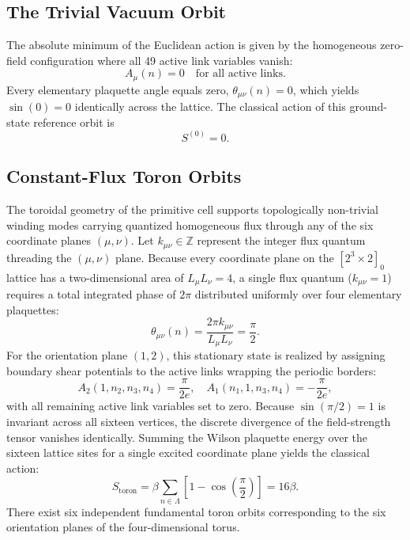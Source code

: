 \documentclass[11pt,a4paper]{article}
\begin{document}
\subsection{The Trivial Vacuum Orbit}
The absolute minimum of the Euclidean action is given by the homogeneous zero-field configuration where all 49 active link variables vanish:
\begin{equation}
A_\mu(n) = 0 \quad \text{for all active links.}
\end{equation}
Every elementary plaquette angle equals zero, $\theta_{\mu\nu}(n) = 0$, which yields $\sin(0) = 0$ identically across the lattice. The classical action of this ground-state reference orbit is
\begin{equation}
S^{(0)} = 0.
\end{equation}

\subsection{Constant-Flux Toron Orbits}
The toroidal geometry of the primitive cell supports topologically non-trivial winding modes carrying quantized homogeneous flux through any of the six coordinate planes $(\mu,\nu)$. Let $k_{\mu\nu} \in \mathbb{Z}$ represent the integer flux quantum threading the $(\mu,\nu)$ plane. Because every coordinate plane on the $[2^3 \times 2]_0$ lattice has a two-dimensional area of $L_\mu L_\nu = 4$, a single flux quantum ($k_{\mu\nu} = 1$) requires a total integrated phase of $2\pi$ distributed uniformly over four elementary plaquettes:
\begin{equation}
\theta_{\mu\nu}(n) = \frac{2\pi k_{\mu\nu}}{L_\mu L_\nu} = \frac{\pi}{2}.
\end{equation}
For the orientation plane $(1,2)$, this stationary state is realized by assigning boundary shear potentials to the active links wrapping the periodic borders:
\begin{equation}
A_2(1, n_2, n_3, n_4) = \frac{\pi}{2 e}, \quad A_1(n_1, 1, n_3, n_4) = -\frac{\pi}{2 e},
\end{equation}
with all remaining active link variables set to zero. Because $\sin(\pi/2) = 1$ is invariant across all sixteen vertices, the discrete divergence of the field-strength tensor vanishes identically. Summing the Wilson plaquette energy over the sixteen lattice sites for a single excited coordinate plane yields the classical action:
\begin{equation}
S_{\text{toron}} = \beta \sum_{n \in \Lambda} \left[ 1 - \cos\left(\frac{\pi}{2}\right) \right] = 16\beta.
\end{equation}
There exist six independent fundamental toron orbits corresponding to the six orientation planes of the four-dimensional torus.
\end{document}
